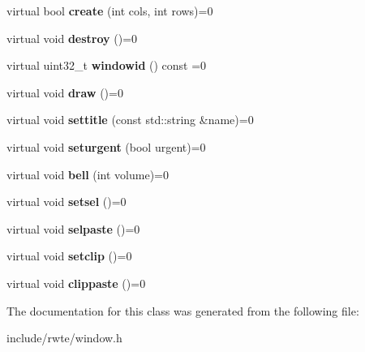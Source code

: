 \begin{DoxyCompactItemize}
\item 
\mbox{\label{classWindow_aa1b1f7f9537bfb9a75d76cd4c0edc3b9}} 
virtual bool {\bfseries create} (int cols, int rows)=0
\item 
\mbox{\label{classWindow_aa7af1be15dc17c208fe64de85c53c17c}} 
virtual void {\bfseries destroy} ()=0
\item 
\mbox{\label{classWindow_a0575eea4ab9f26327a404ae8f7c42bc4}} 
virtual uint32\+\_\+t {\bfseries windowid} () const =0
\item 
\mbox{\label{classWindow_aaf457450558c587a9f93971a4c6a0e9c}} 
virtual void {\bfseries draw} ()=0
\item 
\mbox{\label{classWindow_a89c37e58908cd6fd0c10ffb832206db6}} 
virtual void {\bfseries settitle} (const std\+::string \&name)=0
\item 
\mbox{\label{classWindow_aaec46771b4817a8297315977483a1e24}} 
virtual void {\bfseries seturgent} (bool urgent)=0
\item 
\mbox{\label{classWindow_a8d98aed0acb1cef1f3f52f729d9cf898}} 
virtual void {\bfseries bell} (int volume)=0
\item 
\mbox{\label{classWindow_a0bea08f580fc284136d43257d808b603}} 
virtual void {\bfseries setsel} ()=0
\item 
\mbox{\label{classWindow_a20061d29e4d22ffcdf79c6cb4ed36c59}} 
virtual void {\bfseries selpaste} ()=0
\item 
\mbox{\label{classWindow_adf7d88b46b3f0094a664985ffc00c3b4}} 
virtual void {\bfseries setclip} ()=0
\item 
\mbox{\label{classWindow_a6aad714f1b90fae8c56102fca4a3cee9}} 
virtual void {\bfseries clippaste} ()=0
\end{DoxyCompactItemize}


The documentation for this class was generated from the following file\+:\begin{DoxyCompactItemize}
\item 
include/rwte/window.\+h\end{DoxyCompactItemize}
